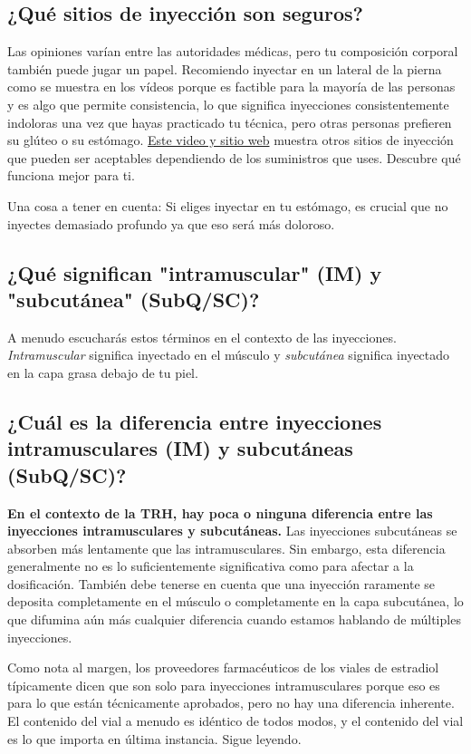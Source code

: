 \documentclass{article}
\begin{document}
\subsection{¿Qué sitios de inyección son seguros?}\label{5-5}

Las opiniones varían entre las autoridades médicas, pero tu composición corporal también puede jugar un papel. Recomiendo inyectar en un lateral de la pierna como se muestra en los vídeos porque es factible para la mayoría de las personas y es algo que permite consistencia, lo que significa inyecciones consistentemente indoloras una vez que hayas practicado tu técnica, pero otras personas prefieren su glúteo o su estómago. \href{https://vertisis.com/articles/how-to-self-administer-a-subcutaneous-injection}{Este video y sitio web} muestra otros sitios de inyección que pueden ser aceptables dependiendo de los suministros que uses. Descubre qué funciona mejor para ti.

Una cosa a tener en cuenta: Si eliges inyectar en tu estómago, es crucial que no inyectes demasiado profundo ya que eso será más doloroso.

\subsection{¿Qué significan "intramuscular" (IM) y "subcutánea" (SubQ/SC)?}

A menudo escucharás estos términos en el contexto de las inyecciones. \textit{Intramuscular} significa inyectado en el músculo y \textit{subcutánea} significa inyectado en la capa grasa debajo de tu piel.

\subsection{¿Cuál es la diferencia entre inyecciones intramusculares (IM) y subcutáneas (SubQ/SC)?}

\textbf{En el contexto de la TRH, hay poca o ninguna diferencia entre las inyecciones intramusculares y subcutáneas.} Las inyecciones subcutáneas se absorben más lentamente que las intramusculares. Sin embargo, esta diferencia generalmente no es lo suficientemente significativa como para afectar a la dosificación. También debe tenerse en cuenta que una inyección raramente se deposita completamente en el músculo o completamente en la capa subcutánea, lo que difumina aún más cualquier diferencia cuando estamos hablando de múltiples inyecciones.

Como nota al margen, los proveedores farmacéuticos de los viales de estradiol típicamente dicen que son solo para inyecciones intramusculares porque eso es para lo que están técnicamente aprobados, pero no hay una diferencia inherente. El contenido del vial a menudo es idéntico de todos modos, y el contenido del vial es lo que importa en última instancia. Sigue leyendo.
\end{document}
